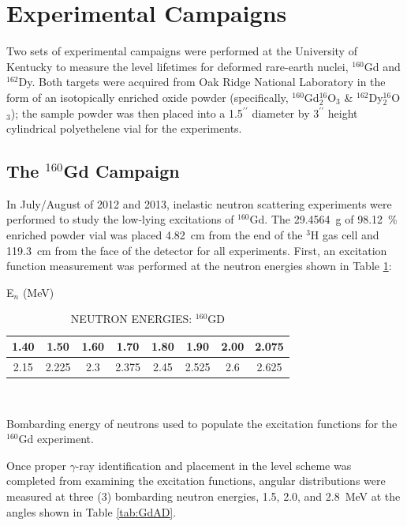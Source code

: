 \section{Experimental Campaigns}
Two sets of experimental campaigns were performed at the University of Kentucky to measure the level lifetimes for deformed rare-earth nuclei, $^{160}$Gd and $^{162}$Dy. Both targets were acquired from Oak Ridge National Laboratory in the form of an isotopically enriched oxide powder (specifically, $^{160}$Gd$_2^{16}$O$_3$ \& $^{162}$Dy$_2^{16}$O$_3$); the sample powder was then placed into a 1.5$^{\prime\prime}$ diameter by 3$^{\prime\prime}$ height cylindrical polyethelene vial for the experiments.
\subsection{The $^{160}$Gd Campaign}\label{sec:Gd_exp}
In July/August of 2012 and 2013, inelastic neutron scattering experiments were performed to study the low-lying excitations of $^{160}$Gd. The 29.4564~g of 98.12~\% enriched powder vial was placed 4.82~cm from the end of the $^3$H gas cell and 119.3~cm from the face of the detector for all experiments. First, an excitation function measurement was performed at the neutron energies shown in Table \ref{tab:GdExF}:

\begin{table}[h!]
\begin{center}
\caption{NEUTRON ENERGIES: $^{160}$GD \label{tab:GdExF}} %
E$_n$ (MeV)\\
\begin{tabular}{c|c|c|c|c|c|c|c}
\hline
\hline
1.40 & 1.50 & 1.60 & 1.70 & 1.80 & 1.90 & 2.00 & 2.075  \\ 
\hline
2.15 & 2.225 & 2.3 & 2.375 & 2.45 & 2.525 & 2.6 & 2.625  \\
\end{tabular}\\
\vspace{10pt}
\end{center}
Bombarding energy of neutrons used to populate the excitation functions for the $^{160}$Gd experiment.
\end{table}

Once proper $\gamma$-ray identification and placement in the level scheme was completed from examining the excitation functions, angular distributions were measured at three (3) bombarding neutron energies, 1.5, 2.0, and 2.8~MeV at the angles shown in Table \ref{tab:GdAD}.

